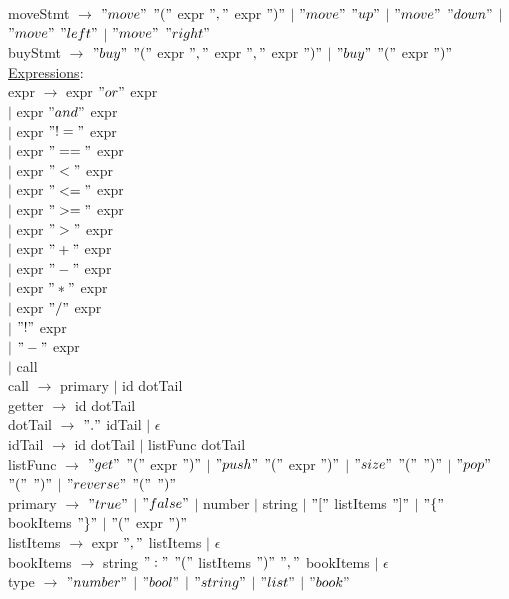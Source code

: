 \documentclass{article}
\begin{document}
moveStmt $\rightarrow$ $"move"$ $"("$ expr $","$ expr $")"$ $\vert$ $"move"$ $"up"$ $\vert$ $"move"$ $"down"$ $\vert$ $"move"$ $"left"$ $\vert$ $"move"$ $"right"$ \\

buyStmt $\rightarrow$ $"buy"$ $"("$ expr $","$ expr $","$ expr $")"$ $\vert$ $"buy"$ $"("$ expr $")"$\\

\underline{Expressions}: \\

expr $\rightarrow$ expr $"or"$ expr \\
$\vert$ expr $"and"$ expr \\
$\vert$ expr $"!="$ expr \\
$\vert$ expr $"=="$ expr \\
$\vert$ expr $"<"$ expr \\
$\vert$ expr $"<="$ expr \\
$\vert$ expr $">="$ expr \\
$\vert$ expr $">"$ expr \\
$\vert$ expr $"+"$ expr \\
$\vert$ expr $"-"$ expr \\
$\vert$ expr $"*"$ expr \\
$\vert$ expr $"/"$ expr \\
$\vert$ $"!"$ expr \\
$\vert$ $"-"$ expr \\
$\vert$ call \\

call $\rightarrow$ primary $\vert$ id dotTail \\

getter $\rightarrow$ id dotTail \\

dotTail $\rightarrow$ $"."$ idTail $\vert$ $\epsilon$ \\

idTail $\rightarrow$ id dotTail $\vert$ listFunc dotTail \\

listFunc $\rightarrow$ $"get"$ $"("$ expr $")"$ $\vert$ $"push"$ $"("$ expr $")"$ $\vert$ $"size"$ $"("$ $")"$ $\vert$ $"pop"$ $"("$ $")"$ $\vert$ $"reverse"$ $"("$ $")"$ \\

primary $\rightarrow$ $"true"$ $\vert$ $"false"$ $\vert$ number $\vert$ string $\vert$ $"["$ listItems $"]"$ $\vert$ $"\{"$ bookItems $"\}"$ $\vert$ $"("$ expr $")"$ \\

listItems $\rightarrow$ expr $","$ listItems $\vert$ $\epsilon$ \\

bookItems $\rightarrow$ string $":"$ $"("$ listItems $")"$ $","$ bookItems $\vert$ $\epsilon$ \\

type $\rightarrow$ $"number"$ $\vert$ $"bool"$ $\vert$ $"string"$ $\vert$ $"list"$ $\vert$ $"book"$ \\
\end{document}
